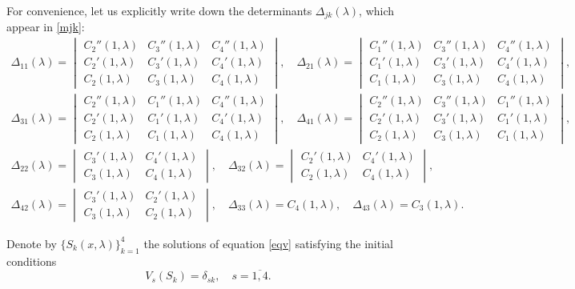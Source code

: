 \documentclass[a4paper,12pt]{article}
\newcommand{\de}{\delta}
\newcommand{\la}{\lambda}
\theoremstyle{plain}
\numberwithin{equation}{section}
\theoremstyle{definition}
\theoremstyle{remark}
\begin{document}
For convenience, let us explicitly write down the determinants $\Delta_{jk}(\la)$, which appear in \eqref{mjk}:
\begin{gather} \label{D1}
\Delta_{11}(\la) = \begin{vmatrix}
  C_2''(1,\la) & C_3''(1,\la) & C_4''(1,\la) \\
  C_2'(1,\la) & C_3'(1,\la) & C_4'(1,\la) \\
  C_2(1,\la) & C_3(1,\la) & C_4(1,\la)
\end{vmatrix}, \quad
\Delta_{21}(\la) = \begin{vmatrix}
  C_1''(1,\la) & C_3''(1,\la) & C_4''(1,\la) \\
  C_1'(1,\la) & C_3'(1,\la) & C_4'(1,\la) \\
  C_1(1,\la) & C_3(1,\la) & C_4(1,\la)
 \end{vmatrix}, \\ \label{D2}
\Delta_{31}(\la) = \begin{vmatrix}
  C_2''(1,\la) & C_1''(1,\la) & C_4''(1,\la) \\
  C_2'(1,\la) & C_1'(1,\la) & C_4'(1,\la) \\
  C_2(1,\la) & C_1(1,\la) & C_4(1,\la)
\end{vmatrix}, \quad
\Delta_{41}(\la) =  \begin{vmatrix}
  C_2''(1,\la) & C_3''(1,\la) & C_1''(1,\la) \\
  C_2'(1,\la) & C_3'(1,\la) & C_1'(1,\la) \\
  C_2(1,\la) & C_3(1,\la) & C_1(1,\la)
\end{vmatrix}, \\ \label{D3}
\Delta_{22}(\la) = \begin{vmatrix}
C_3'(1,\la) & C_4'(1, \la) \\
C_3(1,\la) & C_4(1,\la)
\end{vmatrix}, \quad
\Delta_{32}(\la) = \begin{vmatrix}
C_2'(1,\la) & C_4'(1, \la) \\
C_2(1,\la) & C_4(1,\la)
\end{vmatrix}, \\
\Delta_{42}(\la) = 
\begin{vmatrix}
C_3'(1,\la) & C_2'(1, \la) \\ \label{D4}
C_3(1,\la) & C_2(1,\la)
\end{vmatrix}, \quad \Delta_{33}(\la) = C_4(1,\la), \quad \Delta_{43}(\la) = C_3(1,\la).
\end{gather}

Denote by $\{ S_k(x, \la) \}_{k = 1}^4$ the solutions of equation \eqref{eqv} satisfying the initial conditions
\begin{equation} \label{initS}
V_s(S_k) = \de_{sk}, \quad s = \overline{1,4}.
\end{equation}
\end{document}
